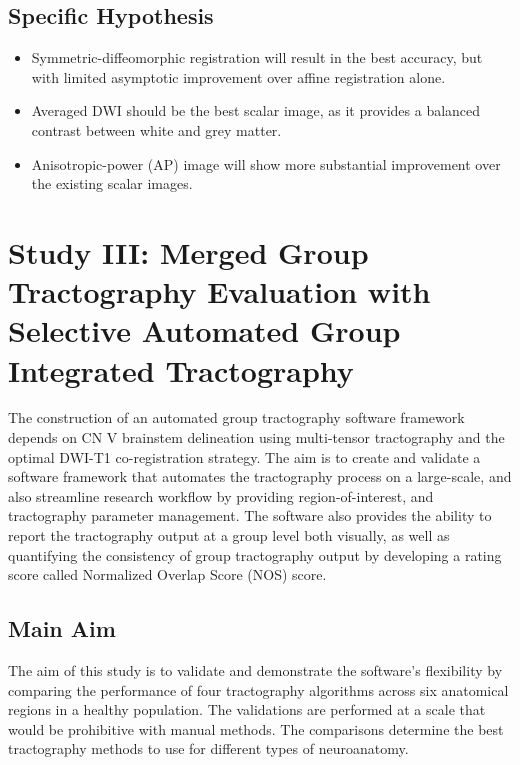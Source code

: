 \subsection{Specific Hypothesis}
\begin{itemize}
    \item Symmetric-diffeomorphic registration will result in the best accuracy, but with limited asymptotic improvement over affine registration alone.
    \item Averaged DWI should be the best scalar image, as it provides a balanced contrast between white and grey matter.
    \item Anisotropic-power (AP) image will show more substantial improvement over the existing scalar images.
\end{itemize}

\section{Study III: Merged Group Tractography Evaluation with Selective Automated Group Integrated Tractography}
The construction of an automated group tractography software framework depends on CN V brainstem delineation using multi-tensor tractography and the optimal DWI-T1 co-registration strategy. The aim is to create and validate a software framework that automates the tractography process on a large-scale, and also streamline research workflow by providing region-of-interest, and tractography parameter management. The software also provides the ability to report the tractography output at a group level both visually, as well as quantifying the consistency of group tractography output by developing a rating score called Normalized Overlap Score (NOS) score. 

\subsection{Main Aim}
The aim of this study is to validate and demonstrate the software's flexibility by comparing the performance of four tractography algorithms across six anatomical regions in a healthy population. The validations are performed  at a scale that would be prohibitive with manual methods. The comparisons determine the best tractography methods to use for different types of neuroanatomy.

